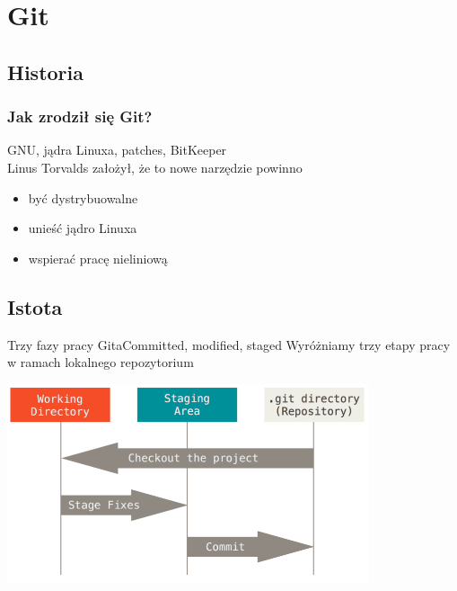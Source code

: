 \documentclass{beamer}
\begin{document}
\section{Git}
\subsection{Historia}
\begin{frame}
 \frametitle{Jak zrodził się Git?}
GNU, jądra Linuxa, patches, BitKeeper \\
Linus Torvalds założył, że to nowe narzędzie powinno \\
  \begin{itemize}
  \item być dystrybuowalne
  \item unieść jądro Linuxa
  \item wspierać pracę nieliniową
 \end{itemize}
\end{frame}

\subsection{Istota}

\begin{frame}{Trzy fazy pracy Gita}{Committed, modified, staged}
 Wyróżniamy trzy etapy pracy w ramach lokalnego repozytorium
  \begin{center}
   \includegraphics[width=0.8\textwidth]{./obrazki/fig-1_6.png}
 \end{center}
\end{frame}
\end{document}
